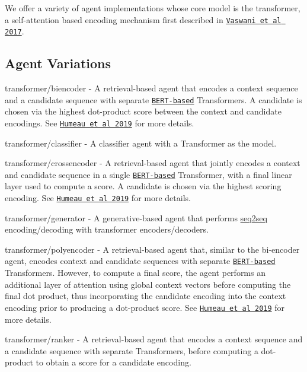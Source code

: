 We offer a variety of agent implementations whose core model is the transformer, a self-\/attention based encoding mechanism first described in \href{https://arxiv.org/abs/1706.03762}{\tt Vaswani et al 2017}.

\subsection*{Agent Variations}


\begin{DoxyItemize}
\item {\ttfamily transformer/biencoder} -\/ A retrieval-\/based agent that encodes a context sequence and a candidate sequence with separate \href{https://arxiv.org/abs/1810.04805}{\tt B\+E\+R\+T-\/based} Transformers. A candidate is chosen via the highest dot-\/product score between the context and candidate encodings. See \href{https://arxiv.org/pdf/1905.01969.pdf}{\tt Humeau et al 2019} for more details.
\item {\ttfamily transformer/classifier} -\/ A classifier agent with a Transformer as the model.
\item {\ttfamily transformer/crossencoder} -\/ A retrieval-\/based agent that jointly encodes a context and candidate sequence in a single \href{https://arxiv.org/abs/1810.04805}{\tt B\+E\+R\+T-\/based} Transformer, with a final linear layer used to compute a score. A candidate is chosen via the highest scoring encoding. See \href{https://arxiv.org/pdf/1905.01969.pdf}{\tt Humeau et al 2019} for more details.
\item {\ttfamily transformer/generator} -\/ A generative-\/based agent that performs \hyperlink{namespaceseq2seq}{seq2seq} encoding/decoding with transformer encoders/decoders.
\item {\ttfamily transformer/polyencoder} -\/ A retrieval-\/based agent that, similar to the bi-\/encoder agent, encodes context and candidate sequences with separate \href{https://arxiv.org/abs/1810.04805}{\tt B\+E\+R\+T-\/based} Transformers. However, to compute a final score, the agent performs an additional layer of attention using global context vectors before computing the final dot product, thus incorporating the candidate encoding into the context encoding prior to producing a dot-\/product score. See \href{https://arxiv.org/pdf/1905.01969.pdf}{\tt Humeau et al 2019} for more details.
\item {\ttfamily transformer/ranker} -\/ A retrieval-\/based agent that encodes a context sequence and a candidate sequence with separate Transformers, before computing a dot-\/product to obtain a score for a candidate encoding. 
\end{DoxyItemize}